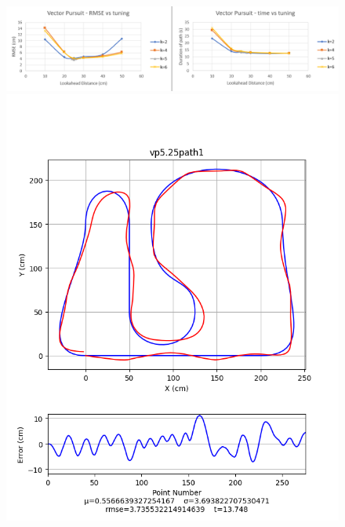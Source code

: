 \documentclass[12pt]{article}
\begin{document}
\begin{flushleft}
\begin{figure}[H]
\includegraphics[width=\linewidth]{images/tuningGraphs/vp}
\includegraphics[width=\linewidth]{images/pathData/vppath1}
\endminipage\hfill
{}

\end{figure}
\end{flushleft}
\end{document}
